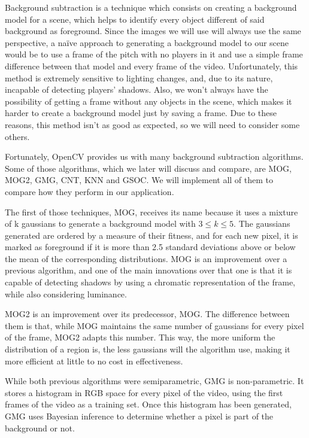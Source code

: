 Background subtraction is a technique which consists on creating a background model for a scene, which helps to identify every object different of said background as foreground. Since the images we will use will always use the same perspective, a naïve approach to generating a background model to our scene would be to use a frame of the pitch with no players in it and use a simple frame difference between that model and every frame of the video. Unfortunately, this method is extremely sensitive to lighting changes, and, due to its nature, incapable of detecting players’ shadows. Also, we won't always have the possibility of getting a frame without any objects in the scene, which makes it harder to create a background model just by saving a frame. Due to these reasons, this method isn’t as good as expected, so we will need to consider some others.

Fortunately, OpenCV provides us with many background subtraction algorithms. Some of those algorithms, which we later will discuss and compare, are MOG, MOG2, GMG, CNT, KNN and GSOC. We will implement all of them to compare how they perform in our application.

The first of those techniques, MOG, receives its name because it uses a mixture of k gaussians to generate a background model with $3 \leq k \leq 5$. The gaussians generated are ordered by a measure of their fitness, and for each new pixel, it is marked as foreground if it is more than 2.5 standard deviations above or below the mean of the corresponding distributions. MOG is an improvement over a previous algorithm, and one of the main innovations over that one is that it is capable of detecting shadows by using a chromatic representation of the frame, while also considering luminance.

MOG2 is an improvement over its predecessor, MOG. The difference between them is that, while MOG maintains the same number of gaussians for every pixel of the frame, MOG2 adapts this number. This way, the more uniform the distribution of a region is, the less gaussians will the algorithm use, making it more efficient at little to no cost in effectiveness.

While both previous algorithms were semiparametric, GMG is non-parametric. It stores a histogram in RGB space for every pixel of the video, using the first frames of the video as a training set. Once this histogram has been generated, GMG uses Bayesian inference to determine whether a pixel is part of the background or not.

